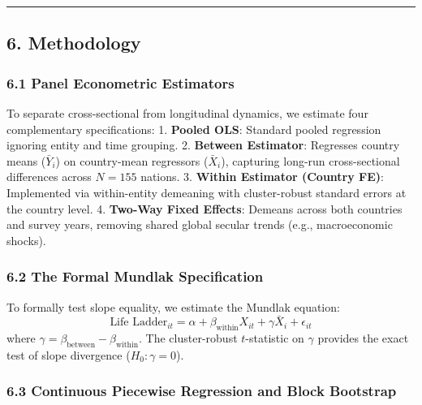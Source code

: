 \documentclass[
]{article}
\begin{document}
\begin{center}\rule{0.5\linewidth}{0.5pt}\end{center}

\hypertarget{methodology}{%
\subsection{6. Methodology}\label{methodology}}

\hypertarget{panel-econometric-estimators}{%
\subsubsection{6.1 Panel Econometric
Estimators}\label{panel-econometric-estimators}}

To separate cross-sectional from longitudinal dynamics, we estimate four
complementary specifications: 1. \textbf{Pooled OLS}: Standard pooled
regression ignoring entity and time grouping. 2. \textbf{Between
Estimator}: Regresses country means (\(\bar{Y}_i\)) on country-mean
regressors (\(\bar{X}_i\)), capturing long-run cross-sectional
differences across \(N = 155\) nations. 3. \textbf{Within Estimator
(Country FE)}: Implemented via within-entity demeaning with
cluster-robust standard errors at the country level. 4. \textbf{Two-Way
Fixed Effects}: Demeans across both countries and survey years, removing
shared global secular trends (e.g., macroeconomic shocks).

\hypertarget{the-formal-mundlak-specification}{%
\subsubsection{6.2 The Formal Mundlak
Specification}\label{the-formal-mundlak-specification}}

To formally test slope equality, we estimate the Mundlak equation:
\[\text{Life Ladder}_{it} = \alpha + \beta_{\text{within}} X_{it} + \gamma \bar{X}_i + \epsilon_{it}\]
where \(\gamma = \beta_{\text{between}} - \beta_{\text{within}}\). The
cluster-robust \(t\)-statistic on \(\gamma\) provides the exact test of
slope divergence (\(H_0: \gamma = 0\)).

\hypertarget{continuous-piecewise-regression-and-block-bootstrap}{%
\subsubsection{6.3 Continuous Piecewise Regression and Block
Bootstrap}\label{continuous-piecewise-regression-and-block-bootstrap}}
\end{document}
